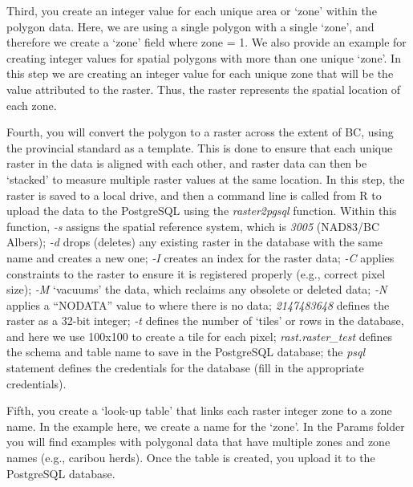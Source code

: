 \documentclass[
]{article}
\begin{document}
Third, you create an integer value for each unique area or `zone' within
the polygon data. Here, we are using a single polygon with a single
`zone', and therefore we create a `zone' field where zone = 1. We also
provide an example for creating integer values for spatial polygons with
more than one unique `zone'. In this step we are creating an integer
value for each unique zone that will be the value attributed to the
raster. Thus, the raster represents the spatial location of each zone.

Fourth, you will convert the polygon to a raster across the extent of
BC, using the provincial standard as a template. This is done to ensure
that each unique raster in the data is aligned with each other, and
raster data can then be `stacked' to measure multiple raster values at
the same location. In this step, the raster is saved to a local drive,
and then a command line is called from R to upload the data to the
PostgreSQL using the \emph{raster2pgsql} function. Within this function,
\emph{-s} assigns the spatial reference system, which is \emph{3005}
(NAD83/BC Albers); \emph{-d} drops (deletes) any existing raster in the
database with the same name and creates a new one; \emph{-I} creates an
index for the raster data; \emph{-C} applies constraints to the raster
to ensure it is registered properly (e.g., correct pixel size);
\emph{-M} `vacuums' the data, which reclaims any obsolete or deleted
data; \emph{-N} applies a ``NODATA'' value to where there is no data;
\emph{2147483648} defines the raster as a 32-bit integer; \emph{-t}
defines the number of `tiles' or rows in the database, and here we use
100x100 to create a tile for each pixel; \emph{rast.raster\_test}
defines the schema and table name to save in the PostgreSQL database;
the \emph{psql} statement defines the credentials for the database (fill
in the appropriate credentials).

Fifth, you create a `look-up table' that links each raster integer zone
to a zone name. In the example here, we create a name for the `zone'. In
the Params folder you will find examples with polygonal data that have
multiple zones and zone names (e.g., caribou herds). Once the table is
created, you upload it to the PostgreSQL database.
\end{document}
